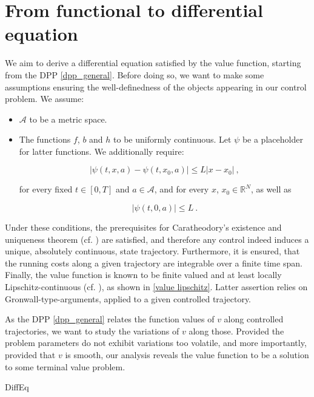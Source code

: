 
\section{From functional to differential equation}

We aim to derive a differential equation satisfied by the value function, starting from the DPP \eqref{dpp_general}. Before doing so, we want to make some assumptions ensuring the well-definedness of the objects appearing in our control problem. We assume:

	\begin{itemize}
		\item
		$ \mathcal{A} $ to be a metric space.
		
		\item The functions $ f $, $ b $ and $ h $ to be uniformly continuous. Let $ \psi $ be a placeholder for latter functions. We additionally require:
		
		\begin{equation}
			\label{Lipschitz}
			\lvert \psi(t, x, a) - \psi(t, x_0, a) \rvert \leq L \lvert x - x_0 \rvert \ ,
		\end{equation}
		
		for every fixed $ t \in \left[0, T \right] $ and $ a \in \mathcal{A} $, and for every $ x $, $ x_0 \in  \mathbb{R}^N $, as well as 
		
		\begin{equation}
			\label{bounded}
			\lvert \psi(t, 0, a) \rvert \leq L \ .
		\end{equation}
		
	\end{itemize}

Under these conditions, the prerequisites for  Caratheodory's existence and uniqueness theorem (cf. \cite[Theorem 1.45 p.~25]{roubivcek}) are satisfied, and therefore any control indeed induces a unique, absolutely continuous, state trajectory. Furthermore, it is ensured, that the running costs along a given trajectory are integrable over a finite time span. Finally, the value function is known to be finite valued and at least locally Lipschitz-continuous (cf. \cite[Inequality (2.36) from Theorem 2.5 p.~165]{zhou}), as shown in \ref{value lipschitz}. Latter assertion relies on Gronwall-type-arguments, applied to a given controlled trajectory.

As the DPP \eqref{dpp_general} relates the function values of $ v $ along controlled trajectories, we want to study the variations of $ v $ along those. Provided the problem parameters do not exhibit variations too volatile, and more importantly, provided that $ v $ is smooth, our analysis reveals the value  function to be a solution to some terminal value problem.

	{DiffEq}